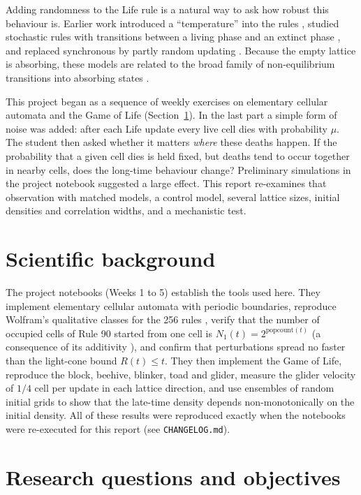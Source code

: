 \documentclass[11pt,a4paper]{article}
\begin{document}
Adding randomness to the Life rule is a natural way to ask how robust this behaviour is. Earlier work introduced a ``temperature'' into the rules \cite{schulman1978}, studied stochastic rules with transitions between a living phase and an extinct phase \cite{monetti1995,nordfalk1996}, and replaced synchronous by partly random updating \cite{blok1999}. Because the empty lattice is absorbing, these models are related to the broad family of non-equilibrium transitions into absorbing states \cite{hinrichsen2000}.

This project began as a sequence of weekly exercises on elementary cellular automata and the Game of Life (Section~\ref{sec:background}). In the last part a simple form of noise was added: after each Life update every live cell dies with probability $\mu$. The student then asked whether it matters \emph{where} these deaths happen. If the probability that a given cell dies is held fixed, but deaths tend to occur together in nearby cells, does the long-time behaviour change? Preliminary simulations in the project notebook suggested a large effect. This report re-examines that observation with matched models, a control model, several lattice sizes, initial densities and correlation widths, and a mechanistic test.

\section{Scientific background}\label{sec:background}

The project notebooks (Weeks 1 to 5) establish the tools used here. They implement elementary cellular automata with periodic boundaries, reproduce Wolfram's qualitative classes for the 256 rules \cite{wolfram1983,wolfram1984}, verify that the number of occupied cells of Rule 90 started from one cell is $N_1(t)=2^{\mathrm{popcount}(t)}$ (a consequence of its additivity \cite{martin1984}), and confirm that perturbations spread no faster than the light-cone bound $R(t)\le t$. They then implement the Game of Life, reproduce the block, beehive, blinker, toad and glider, measure the glider velocity of $1/4$ cell per update in each lattice direction, and use ensembles of random initial grids to show that the late-time density depends non-monotonically on the initial density. All of these results were reproduced exactly when the notebooks were re-executed for this report (see \texttt{CHANGELOG.md}).

\section{Research questions and objectives}
\end{document}

